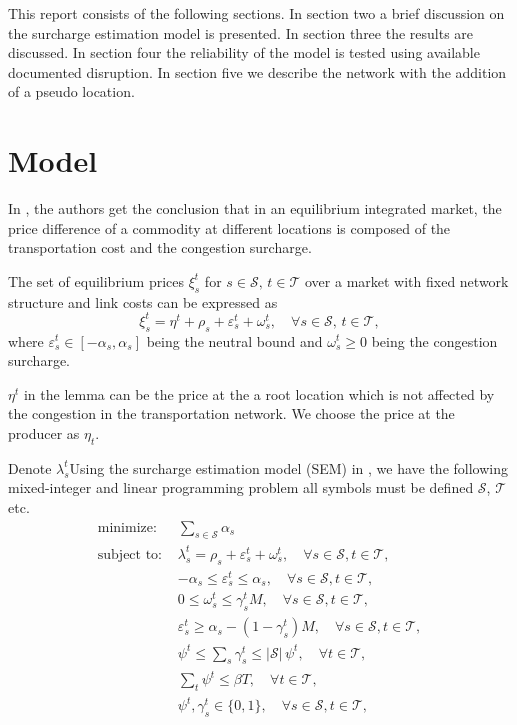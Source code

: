 \documentclass[11pt]{m2pi}
\newcommand{\cS}{\mathcal{S}}
\newcommand{\cT}{\mathcal{T}}
\newcommand{\ves}{\varepsilon}
\begin{document}
This report consists of the following sections. In section two a brief discussion on the surcharge estimation model is presented. In section three the results are discussed. In section four the reliability of the model is tested using available documented disruption. In section five we describe the network with the addition of a pseudo location. 

\section{Model}
In \cite{Zhu2020}, the authors get the conclusion that in an equilibrium integrated market, the price difference of a commodity at different locations is composed of the transportation cost and the congestion surcharge. 
\begin{lemma}
The set of equilibrium prices $\xi_s^t$ for $s\in\cS,\,t\in\cT$ over a market with fixed network structure and link costs can be expressed as 
$$\xi_s^t = \eta^t+\rho_s+\ves_s^t +\omega_s^t,\quad \forall s\in\cS,\,t\in\cT,$$
where $\ves_s^t\in[-\alpha_s, \alpha_s]$ being the neutral bound and $\omega_s^t\geq 0$ being the congestion surcharge. 
\end{lemma}
$\eta^t$ in the lemma can be the price at the a root location which is not affected by the congestion in the transportation network. We choose the price at the producer as $\eta_t$. 

Denote $\lambda_s^t$Using the surcharge estimation model (SEM) in \cite{Zhu2020}, we have the following mixed-integer and linear programming problem {\color{red} all symbols must be defined $\mathcal{S}$, $\mathcal{T}$ etc.}
\begin{align}\label{1}
\text{minimize: } &\sum_{s\in\cS} \alpha_s\\
\text{subject to: } &\lambda_s^t = \rho_s + \ves_s^t +\omega_s^t,\quad \forall \nonumber s\in\cS,t\in\cT,\\ \nonumber
&-\alpha_s\leq\ves_s^t \leq \alpha_s,\quad \forall s\in\cS,t\in\cT,\\ \nonumber
&0\leq\omega_s^t\leq \gamma_s^t M,\quad \forall s\in\cS,t\in\cT,\\ \nonumber
&\ves_s^t \geq \alpha_s - (1-\gamma_s^t) M,\quad \forall s\in\cS,t\in\cT,\\ \nonumber
&\psi^t\leq\sum_s \gamma_s^t\leq |\cS|\, \psi^t, \quad \forall t\in\cT,\\ \nonumber
&\sum_t \psi^t \leq \beta T, \quad \forall t\in\cT,\\ \nonumber
&\psi^t, \gamma_s^t \in\{0,1\}, \quad \forall s\in\cS,t\in\cT,\\ \nonumber
\end{align}
\end{document}
